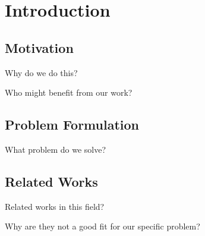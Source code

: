 \section{Introduction}

\subsection{Motivation}

Why do we do this? 

Who might benefit from our work?


\subsection{Problem Formulation}

What problem do we solve?


\subsection{Related Works}

Related works in this field?

Why are they not a good fit for our specific problem? 
